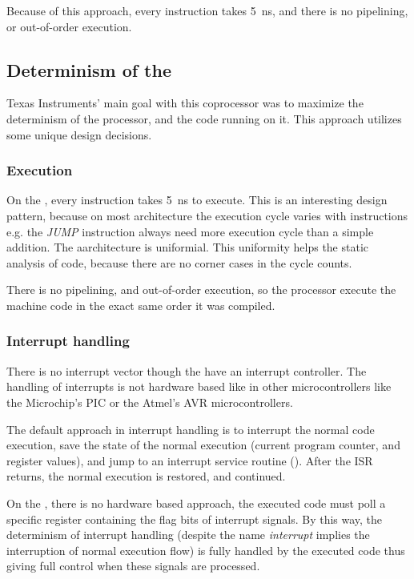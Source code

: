  Because of this approach, every instruction takes \SI{5}{\nano\second}, and there is no pipelining, or out-of-order execution.

\subsection{Determinism of the \pru}

Texas Instruments' main goal with this coprocessor was to maximize the determinism of the processor, and the code running on it. This approach utilizes some unique design decisions.

\subsubsection{Execution}

On the \pru, every instruction takes \SI{5}{\nano\second} to execute. This is an interesting design pattern, because on most architecture the execution cycle varies with instructions e.g. the \emph{JUMP} instruction always need more execution cycle than a simple addition. The \pru aarchitecture is uniformial. This uniformity helps the static analysis of code, because there are no corner cases in the cycle counts.

There is no pipelining, and out-of-order execution, so the processor execute the machine code in the exact same order it was compiled.

\subsubsection{Interrupt handling}

There is no interrupt vector though the \pruss have an interrupt controller. The handling of interrupts is not hardware based like in other microcontrollers like the Microchip's PIC or the Atmel's AVR microcontrollers.

The default approach in interrupt handling is to interrupt the normal code execution, save the state of the normal execution (current program counter, and register values), and jump to an interrupt service routine (). After the ISR returns, the normal execution is restored, and continued.

On the \pru, there is no hardware based approach, the executed code must poll a specific register containing the flag bits of interrupt signals. By this way, the determinism of interrupt handling (despite the name \emph{interrupt} implies the interruption of normal execution flow) is fully handled by the executed code thus giving full control when these signals are processed.
